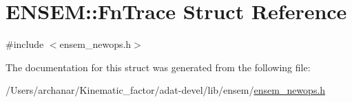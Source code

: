 \hypertarget{structENSEM_1_1FnTrace}{}\section{E\+N\+S\+EM\+:\+:Fn\+Trace Struct Reference}
\label{structENSEM_1_1FnTrace}


{\ttfamily \#include $<$ensem\+\_\+newops.\+h$>$}



The documentation for this struct was generated from the following file\+:\begin{DoxyCompactItemize}
\item 
/\+Users/archanar/\+Kinematic\+\_\+factor/adat-\/devel/lib/ensem/\mbox{\hyperlink{adat-devel_2lib_2ensem_2ensem__newops_8h}{ensem\+\_\+newops.\+h}}\end{DoxyCompactItemize}
